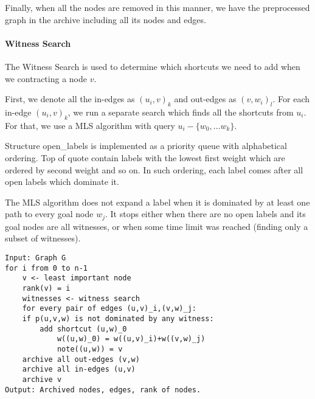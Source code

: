 Finally, when all the nodes are removed in this manner, we have the preprocessed graph in the archive including all its nodes and edges.

\paragraph*{Witness Search}
The Witness Search is used to determine which shortcuts we need to add when we contracting a node $v$. 

First, we denote all the in-edges as $(u_i,v)_k$ and out-edges as $(v,w_i)_l$. For each in-edge $(u_i,v)_k$, we run a separate search which finds all the shortcuts from $u_i$. For that, we use a MLS algorithm with query $u_i-\{w_0,\dots w_k\}$. 

Structure open\_labels is implemented as a priority queue with alphabetical ordering. 
Top of quote contain labels with the lowest first weight which are ordered by second weight and so on. In such ordering, each label comes after all open labels which dominate it.

The MLS algorithm does not expand a label when it is dominated by at least one path to every goal node $w_j$. It stops either when there are no open labels and its goal nodes are all witnesses,
or when some time limit was reached (finding only a subset of witnesses). 

\renewcommand{\lstlistingname}{Pseudocode}
\begin{lstlisting}[caption={MCHp},label=MCHp,captionpos=t,float,abovecaptionskip=-\medskipamount]
Input: Graph G
for i from 0 to n-1
    v <- least important node
    rank(v) = i
    witnesses <- witness search
    for every pair of edges (u,v)_i,(v,w)_j:
    if p(u,v,w) is not dominated by any witness:
        add shortcut (u,w)_0
            w((u,w)_0) = w((u,v)_i)+w((v,w)_j)
            note((u,w)) = v
    archive all out-edges (v,w) 
    archive all in-edges (u,v)
    archive v
Output: Archived nodes, edges, rank of nodes.
\end{lstlisting}
